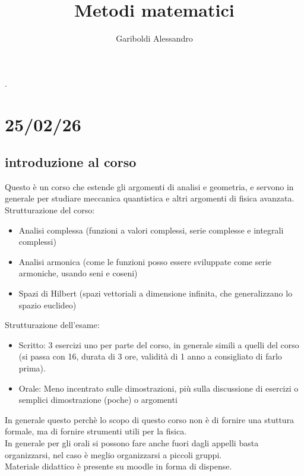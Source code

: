 \documentclass[a4paper, oneside]{article}
\title{Metodi matematici}
\author{Gariboldi Alessandro}
\date{ }
\begin{document}
                {}          %
                {}          %
                {\slshape}  %
                {}          %
                {\bfseries} %
                {.}         %
                {\newline}         %
                {}          %
\theoremstyle{theoremEnv}

\newtheorem{definition}{Definizione}[section]
\newtheorem{theorem}{Teorema}[section]
\newtheorem{lemma}{Lemma}[section]
\newtheorem{observation}{Oss.}[section]
\newtheorem{corollary}{Corollario}[theorem]
\newtheorem{example}{Esempio}[section]
\newtheorem{problem}{Problema}[section]
\newtheorem{solution}{Soluzione}[section]
\newtheorem{proposition}{Proposizione}[section]


\maketitle
\section{25/02/26}
\subsection{introduzione al corso}
Questo è un corso che estende gli argomenti di analisi e geometria, e servono in generale per studiare meccanica quantistica 
e altri argomenti di fisica avanzata.\\
Strutturazione del corso:
\begin{itemize}
    \item Analisi complessa (funzioni a valori complessi, serie complesse e integrali complessi)
    \item Analisi armonica (come le funzioni posso essere sviluppate come serie armoniche, usando seni e coseni)
    \item Spazi di Hilbert (spazi vettoriali a dimensione infinita, che generalizzano lo spazio euclideo)
\end{itemize}
Strutturazione dell'esame:
\begin{itemize}
    \item Scritto: 3 esercizi uno per parte del corso, in generale simili a quelli del corso (si passa con 16, durata di 3 ore, validità di 1 anno a consigliato di farlo prima).
    \item Orale: Meno incentrato sulle dimostrazioni, più sulla discussione di esercizi o semplici dimostrazione (poche) o argomenti
\end{itemize}
In generale questo perchè lo scopo di questo corso non è di fornire una stuttura formale, ma di fornire strumenti utili per la fisica.\\
In generale per gli orali si possono fare anche fuori dagli appelli basta organizzarsi, nel caso è meglio organizzarsi a piccoli gruppi.\\
Materiale didattico è presente su moodle in forma di dispense. 
\end{document}
